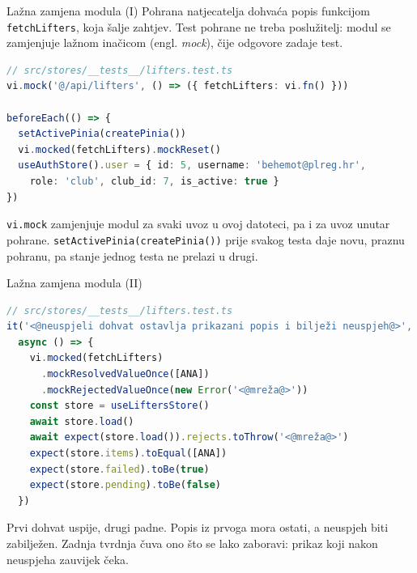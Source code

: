\begin{frame}[fragile]{Lažna zamjena modula (I)}
Pohrana natjecatelja dohvaća popis funkcijom \texttt{fetchLifters}, koja šalje zahtjev. Test pohrane ne treba poslužitelj: modul se zamjenjuje lažnom inačicom (engl. \emph{mock}), čije odgovore zadaje test.

\begin{lstlisting}[language=typescript]
// src/stores/__tests__/lifters.test.ts
vi.mock('@/api/lifters', () => ({ fetchLifters: vi.fn() }))

beforeEach(() => {
  setActivePinia(createPinia())
  vi.mocked(fetchLifters).mockReset()
  useAuthStore().user = { id: 5, username: 'behemot@plreg.hr',
    role: 'club', club_id: 7, is_active: true }
})
\end{lstlisting}

\vspace{0.3em}
\texttt{vi.mock} zamjenjuje modul za svaki uvoz u ovoj datoteci, pa i za uvoz unutar pohrane. \texttt{setActivePinia(createPinia())} prije svakog testa daje novu, praznu pohranu, pa stanje jednog testa ne prelazi u drugi.
\end{frame}

\begin{frame}[fragile]{Lažna zamjena modula (II)}
\begin{lstlisting}[language=typescript]
// src/stores/__tests__/lifters.test.ts
it('<@neuspjeli dohvat ostavlja prikazani popis i bilježi neuspjeh@>',
  async () => {
    vi.mocked(fetchLifters)
      .mockResolvedValueOnce([ANA])
      .mockRejectedValueOnce(new Error('<@mreža@>'))
    const store = useLiftersStore()
    await store.load()
    await expect(store.load()).rejects.toThrow('<@mreža@>')
    expect(store.items).toEqual([ANA])
    expect(store.failed).toBe(true)
    expect(store.pending).toBe(false)
  })
\end{lstlisting}

\vspace{0.3em}
Prvi dohvat uspije, drugi padne. Popis iz prvoga mora ostati, a neuspjeh biti zabilježen. Zadnja tvrdnja čuva ono što se lako zaboravi: prikaz koji nakon neuspjeha zauvijek čeka.
\end{frame}

